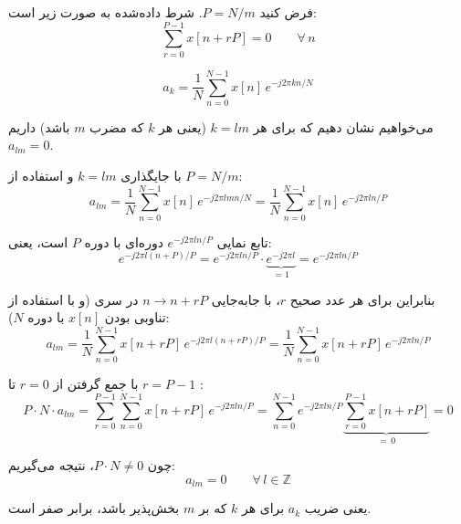 فرض کنید $P = N/m$.
شرط داده‌شده به صورت زیر است:
\[
\sum_{r=0}^{P-1} x\!\left[n + rP\right] = 0 \qquad \forall\, n
\]

\[
a_k = \frac{1}{N}\sum_{n=0}^{N-1} x[n]\, e^{-j2\pi kn/N}
\]

می‌خواهیم نشان دهیم که برای هر $k = lm$ (یعنی هر $k$ که مضرب $m$ باشد) داریم $a_{lm} = 0$.


با جایگذاری $k = lm$ و استفاده از $P = N/m$:
\[
a_{lm} = \frac{1}{N}\sum_{n=0}^{N-1} x[n]\, e^{-j2\pi lmn/N}
= \frac{1}{N}\sum_{n=0}^{N-1} x[n]\, e^{-j2\pi ln/P}
\]

 تابع نمایی $e^{-j2\pi ln/P}$ دوره‌ای با دوره $P$ است، یعنی:
\[
e^{-j2\pi l(n+P)/P} = e^{-j2\pi ln/P}\cdot \underbrace{e^{-j2\pi l}}_{=1} = e^{-j2\pi ln/P}
\]

بنابراین برای هر عدد صحیح $r$، با جابه‌جایی $n \to n+rP$ در سری (و با استفاده از تناوبی بودن $x[n]$ با دوره $N$):
\[
a_{lm}
= \frac{1}{N}\sum_{n=0}^{N-1} x[n+rP]\, e^{-j2\pi l(n+rP)/P}
= \frac{1}{N}\sum_{n=0}^{N-1} x[n+rP]\, e^{-j2\pi ln/P}
\]

با جمع گرفتن از $r=0$ تا $r=P-1$ :
\[
P \cdot N \cdot a_{lm}
= \sum_{r=0}^{P-1}\sum_{n=0}^{N-1} x[n+rP]\, e^{-j2\pi ln/P}
= \sum_{n=0}^{N-1} e^{-j2\pi ln/P}
  \underbrace{\sum_{r=0}^{P-1} x[n+rP]}_{=\,0}
= 0
\]

چون $P \cdot N \neq 0$، نتیجه می‌گیریم:
\[
\boxed{a_{lm} = 0 \qquad \forall\, l \in \mathbb{Z}}
\]

یعنی ضریب $a_k$ برای هر $k$ که بر $m$ بخش‌پذیر باشد، برابر صفر است.

